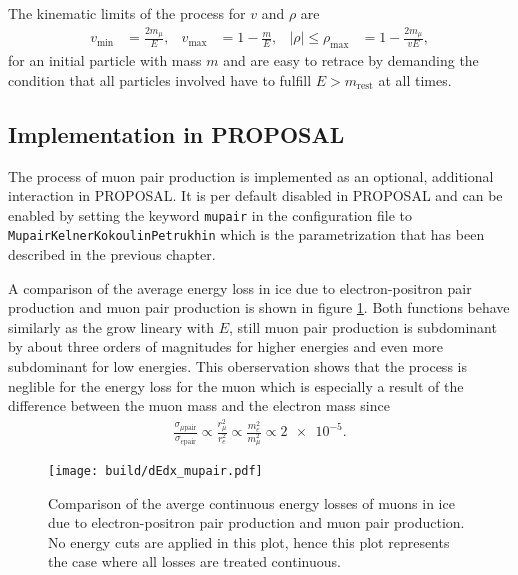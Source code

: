 The kinematic limits of the process for $v$ and $\rho$ are
%
\begin{align}
    v_\text{min} &= \frac{2 m_{\mu}}{E}, & v_\text{max} &= 1 - \frac{m}{E}, & \left| \rho \right| \leq \rho_{\text{max}} &= 1 - \frac{2 m_{\mu}}{v E},
\end{align}
%
for an initial particle with mass $m$ and are easy to retrace by demanding the condition that all particles involved have to fulfill $E > m_{\text{rest}}$ at all times.

\subsection{Implementation in PROPOSAL}

\begin{sloppypar}
The process of muon pair production is implemented as an optional, additional interaction in PROPOSAL.
It is per default disabled in PROPOSAL and can be enabled by setting the keyword \texttt{mupair} in the configuration file to \texttt{MupairKelnerKokoulinPetrukhin} which is the parametrization that has been described in the previous chapter.
\end{sloppypar}

A comparison of the average energy loss in ice due to electron-positron pair production and muon pair production is shown in figure \ref{fig:dEdx_mupair}.
Both functions behave similarly as the grow lineary with $E$, still muon pair production is subdominant by about three orders of magnitudes for higher energies and even more subdominant for low energies.
This oberservation shows that the process is neglible for the energy loss for the muon which is especially a result of the difference between the muon mass and the electron mass since 
\begin{align*}
	\frac{\sigma_{\mu \text{pair}}}{\sigma_{e \text{pair}}} \propto \frac{r_{\mu}^2}{r_e^2} \propto \frac{m_e^2}{m_{\mu}^2} \propto \num{2e-5}.
\end{align*}

\begin{figure}
    \centering
    \texttt{[image: build/dEdx\_mupair.pdf]}
    \caption{Comparison of the averge continuous energy losses of muons in ice due to electron-positron pair production and muon pair production. No energy cuts are applied in this plot, hence this plot represents the case where all losses are treated continuous.}
    \label{fig:dEdx_mupair}
\end{figure}

